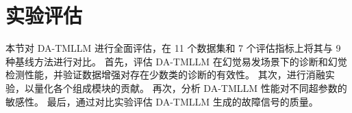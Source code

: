 
\section{实验评估}\label{sec:DA-TMLLM_experiment}

本节对 DA-TMLLM 进行全面评估，在 11 个数据集和 7 个评估指标上将其与 9 种基线方法进行对比。
首先，评估 DA-TMLLM 在幻觉易发场景下的诊断和幻觉检测性能，并验证数据增强对存在少数类的诊断的有效性。
其次，进行消融实验，以量化各个组成模块的贡献。
再次，分析 DA-TMLLM 性能对不同超参数的敏感性。
最后，通过对比实验评估 DA-TMLLM 生成的故障信号的质量。

